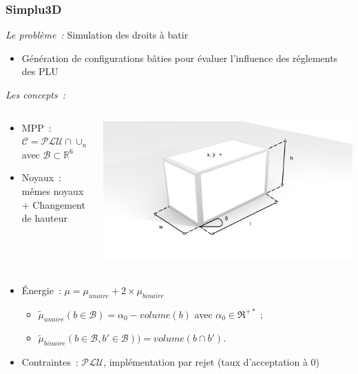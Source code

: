 \documentclass{beamer}
\begin{document}
\begin{frame}
\frametitle{Simplu3D}
\emph{Le probl\`eme~:}  Simulation des droits \`a batir
\begin{itemize}
\item Génération de configurations bâties pour évaluer l'influence des réglements des PLU
\end{itemize}
\emph{Les concepts~:}
\begin{columns}
\begin{column}{0.55\textwidth}
\begin{itemize}
\item MPP~:  $ \mathcal{C} =\mathcal{PLU} \cap \cup_{n} \mathcal{B}^n$  avec $\mathcal{B}  \subset  \mathds{R}^{6}$
\item Noyaux~: mêmes noyaux + Changement de hauteur
\end{itemize}
\end{column}
\begin{column}{0.45\textwidth}
 \includegraphics[width=\textwidth]{boiteFin.png}
\end{column}
\end{columns}
\begin{itemize}
\item Énergie~: $\mu = \mu_{unaire} + 2 \times \mu_{binaire}$
\begin{itemize}
\item $\tilde \mu_{unaire}(b \in \mathcal{B})=\alpha_{0} - volume(b)$ avec $\alpha_{0} \in \Re^{+*}$ ;
\item $\tilde \mu_{binaire}(b \in \mathcal{B}, b' \in \mathcal{B})) = volume(b \cap b')$.
\end{itemize}
\item Contraintes~:  $\mathcal{PLU}$, implémentation par rejet (taux d'acceptation à 0)
\end{itemize}


\end{frame}
\end{document}
